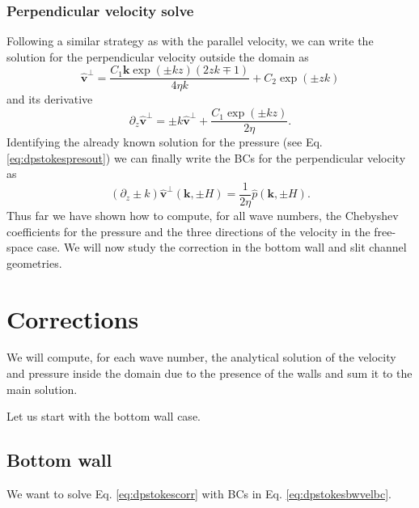 \documentclass[ twoside,openright,titlepage,numbers=noenddot,%
headinclude,footinclude,cleardoublepage=empty,abstract=on,
BCOR=5mm,paper=b5,fontsize=11pt, dvipsnames
]{scrreprt}
\renewcommand{\vec}[1]{\bm{#1}}
\newcommand{\fou}[1]{\widehat{#1}}
\newcommand{\fvel}{v}
\begin{document}
\subsubsection*{Perpendicular velocity solve}
Following a similar strategy as with the parallel velocity, we can write the solution for the perpendicular velocity outside the domain as
\begin{equation}
    \label{eq:dpstokesperpvel}
  \fou{\vec{\fvel}}^{\perp} = \frac{C_1\vec{k}\exp(\pm kz)\left(2zk\mp 1\right)}{4\eta k} + C_2\exp(\pm zk)
\end{equation}
and its derivative
\begin{equation}
  \label{eq:dpstokesperpvelder}
  \partial_z\fou{\vec{\fvel}}^{\perp} = \pm k\fou{\vec{\fvel}}^{\perp} + \frac{C_1\exp(\pm kz)}{2\eta}.
\end{equation}
Identifying the already known solution for the pressure (see Eq. \eqref{eq:dpstokespresout}) we can finally write the \glspl{BC} for the perpendicular velocity as
\begin{equation}
  \label{eq:dpstokesperpvelbc}
  \left(\partial_z\pm k\right)\fou{\vec{\fvel}}^\perp(\vec{k}, \pm H) = \frac{1}{2\eta}\fou{p}(\vec{k}, \pm H).
\end{equation}
Thus far we have shown how to compute, for all wave numbers, the Chebyshev coefficients for the pressure and the three directions of the velocity in the free-space case. We will now study the correction in the bottom wall and slit channel geometries.
\section{Corrections}
We will compute, for each wave number, the analytical solution of the velocity and pressure inside the domain due to the presence of the walls and sum it to the main solution.

Let us start with the bottom wall case.
\subsection*{Bottom wall}

We want to solve Eq. \eqref{eq:dpstokescorr} with \glspl{BC} in Eq. \eqref{eq:dpstokesbwvelbc}.
\end{document}
